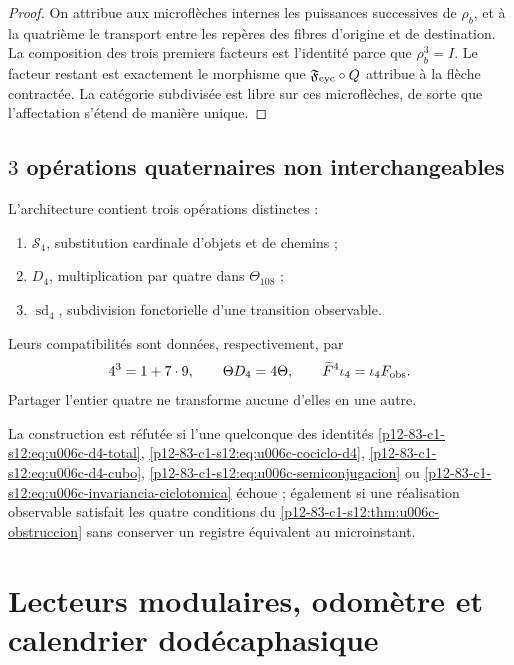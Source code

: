 \begin{proof}
On attribue aux microflèches internes les puissances successives de
\(\rho_b\), et à la quatrième le transport entre les repères des fibres
d’origine et de destination. La composition des trois premiers facteurs est
l’identité parce que \(\rho_b^3=I\). Le facteur restant est exactement le
morphisme que \(\mathfrak F_{\rm cyc}\circ Q\) attribue à la flèche
contractée. La catégorie subdivisée est libre sur ces microflèches, de sorte que
l’affectation s’étend de manière unique.
\end{proof}

\subsection{\(3\) opérations quaternaires non interchangeables}

L’architecture contient trois opérations distinctes :
\begin{enumerate}
 \item \(\mathcal S_4\), substitution cardinale d’objets et de chemins ;
 \item \(D_4\), multiplication par quatre dans
 \(\Theta_{108}\) ;
 \item \(\operatorname{sd}_4\), subdivision fonctorielle d’une transition
 observable.
\end{enumerate}
Leurs compatibilités sont données, respectivement, par
\[
 4^3=1+7\cdot9,\qquad
 \Theta D_4=4\Theta,\qquad
 \widetilde F^4\iota_4=\iota_4F_{\rm obs}.
\]
Partager l’entier quatre ne transforme aucune d’elles en une autre.

\begin{criterion}
\label{p12-83-c1-s12:crit:u006c-refutacion}
La construction est réfutée si l’une quelconque des identités
\eqref{p12-83-c1-s12:eq:u006c-d4-total},
\eqref{p12-83-c1-s12:eq:u006c-cociclo-d4},
\eqref{p12-83-c1-s12:eq:u006c-d4-cubo},
\eqref{p12-83-c1-s12:eq:u006c-semiconjugacion} ou
\eqref{p12-83-c1-s12:eq:u006c-invariancia-ciclotomica} échoue ; également si une réalisation
observable satisfait les quatre conditions du
\cref{p12-83-c1-s12:thm:u006c-obstruccion} sans conserver un registre équivalent au
microinstant.
\end{criterion}



\section{Lecteurs modulaires, odomètre et calendrier dodécaphasique}
\label{p12-83-c1-s13:chap:tpk-lectores-odometro-calendario}


